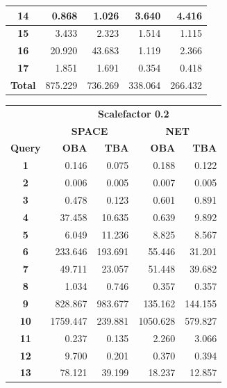 \documentclass[a4paper]{article}
\begin{document}
\begin{figure}[h]
\begin{minipage}{0.5\linewidth}
\begin{tiny}
\begin{tabular}{|c|r|r|r|r|}
        \hline
        \textbf{14}&0.868&1.026&3.640&4.416\\
        \hline
        \textbf{15}&3.433&2.323&1.514&1.115\\
        \hline
        \textbf{16}&20.920&43.683&1.119&2.366\\
        \hline
        \textbf{17}&1.851&1.691&0.354&0.418\\
        \hline
        \textbf{Total}&875.229&736.269&338.064&266.432\\
        \hline
      \end{tabular}
    \end{tiny}
  \end{minipage} \hfill
  \begin{minipage}{0.5\linewidth}
    \begin{tiny}
      \begin{tabular}{|c|r|r|r|r|}
        \hline
        &\multicolumn{4}{c|}{\textbf{Scalefactor 0.2}}\\
        \cline{2-5}
        &\multicolumn{2}{c|}{\textbf{SPACE}}&\multicolumn{2}{c|}{\textbf{NET}}\\
        \hline
        \textbf{Query}&\textbf{OBA}&\textbf{TBA}&\textbf{OBA}&\textbf{TBA}\\
        \hline
        \textbf{1}&0.146&0.075&0.188&0.122\\
        \hline
        \textbf{2}&0.006&0.005&0.007&0.005\\
        \hline
        \textbf{3}&0.478&0.123&0.601&0.891\\
        \hline
        \textbf{4}&37.458&10.635&0.639&9.892\\
        \hline
        \textbf{5}&6.049&11.236&8.825&8.567\\
        \hline
        \textbf{6}&233.646&193.691&55.446&31.201\\
        \hline
        \textbf{7}&49.711&23.057&51.448&39.682\\
        \hline
        \textbf{8}&1.034&0.746&0.357&0.357\\
        \hline
        \textbf{9}&828.867&983.677&135.162&144.155\\
        \hline
        \textbf{10}&1759.447&239.881&1050.628&579.827\\
        \hline
        \textbf{11}&0.237&0.135&2.260&3.066\\
        \hline
        \textbf{12}&9.700&0.201&0.370&0.394\\
        \hline
        \textbf{13}&78.121&39.199&18.237&12.857\\

\end{tabular}
\end{tiny}
\end{minipage}
\end{figure}
\end{document}
